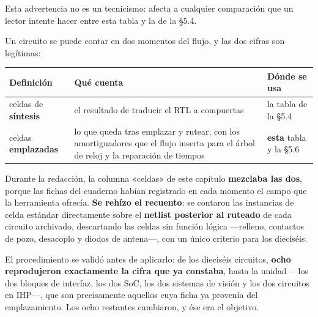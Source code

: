 Esta advertencia no es un tecnicismo: afecta a cualquier comparación que
un lector intente hacer entre esta tabla y la de la §5.4.

Un circuito se puede contar en dos momentos del flujo, y las dos cifras
son legítimas:

\begin{longtable}[]{@{}
  >{\raggedright\arraybackslash}p{}
  >{\raggedright\arraybackslash}p{}
  >{\raggedright\arraybackslash}p{}@{}}
\toprule\noalign{}
\begin{minipage}[b]{\linewidth}\raggedright
Definición
\end{minipage} & \begin{minipage}[b]{\linewidth}\raggedright
Qué cuenta
\end{minipage} & \begin{minipage}[b]{\linewidth}\raggedright
Dónde se usa
\end{minipage} \\
\midrule\noalign{}
\endhead
\bottomrule\noalign{}
\endlastfoot
celdas de \textbf{síntesis} & el resultado de traducir el RTL a
compuertas & la tabla de la §5.4 \\
celdas \textbf{emplazadas} & lo que queda tras emplazar y rutear, con
los amortiguadores que el flujo inserta para el árbol de reloj y la
reparación de tiempos & \textbf{esta} tabla y la §5.6 \\
\end{longtable}

Durante la redacción, la columna «celdas» de este capítulo
\textbf{mezclaba las dos}, porque las fichas del cuaderno habían
registrado en cada momento el campo que la herramienta ofrecía.
\textbf{Se rehízo el recuento}: se contaron las instancias de celda
estándar directamente sobre el \textbf{netlist posterior al ruteado} de
cada circuito archivado, descartando las celdas sin función lógica
---relleno, contactos de pozo, desacoplo y diodos de antena---, con un
único criterio para los dieciséis.

El procedimiento se validó antes de aplicarlo: de los dieciséis
circuitos, \textbf{ocho reprodujeron exactamente la cifra que ya
constaba}, hasta la unidad ---los dos bloques de interfaz, los dos SoC,
los dos sistemas de visión y los dos circuitos en IHP---, que son
precisamente aquellos cuya ficha ya provenía del emplazamiento. Los ocho
restantes cambiaron, y ése era el objetivo.

